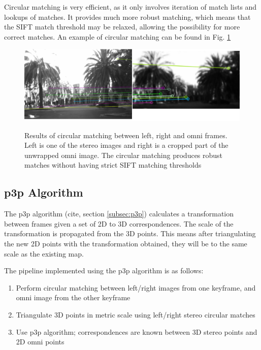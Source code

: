 Circular matching is very efficient, as it only involves iteration of match lists and lookups of matches.  It provides much more robust matching, which means that the SIFT match threshold may be relaxed, allowing the possibility for more correct matches. An example of circular matching can be found in Fig. \ref{fig:circular_match} 

\begin{figure}[h]
  \centering
    \includegraphics[width=1.0\textwidth]{chapters/images/circular_match}\\
  \caption{Results of circular matching between left, right and omni frames. Left is one of the stereo images and right is a cropped part of the unwrapped omni image. The circular matching produces robust matches without having strict SIFT matching thresholds}
  \label{fig:circular_match}
\end{figure}

\subsection{p3p Algorithm}


The p3p algorithm (cite, section \ref{subsec:p3p}) calculates a transformation between frames given a set of 2D to 3D correspondences.  The scale of the transformation is propagated from the 3D points.  This means after triangulating the new 2D points with the transformation obtained, they will be to the same scale as the existing map.

The pipeline implemented using the p3p algorithm is as follows:

\begin{enumerate}
\itemsep0em
 \item Perform circular matching between left/right images from one keyframe, and omni image from the other keyframe
 \item Triangulate 3D points in metric scale using left/right stereo circular matches
 \item Use p3p algorithm; correspondences are known between 3D stereo points and 2D omni points
\end{enumerate}


